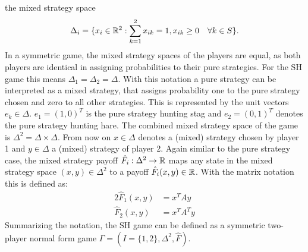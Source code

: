 the mixed strategy space 
\begin{align*}
        \Delta_i = \{ x_i \in \mathbb{R}^2 : \sum_{k=1}^2 x_{ik} = 1, x_{ik} \geq 0 \quad
\forall k \in S\}.
\end{align*}
In a symmetric game, the mixed strategy spaces of the players are
equal, as both players are identical in assigning probabilities to their
pure strategies. For the SH game this means $\Delta_1 = \Delta_2 = \Delta$.
With this notation a pure strategy can be interpreted as a mixed strategy,
that assigns probability one to the pure strategy chosen and zero to all
other strategies. This is represented by the unit vectors 
$e_k \in \Delta$. $e_1 = (1,0)^T$ is the pure strategy hunting stag 
and $e_2 =(0,1)^T$ denotes the pure strategy hunting hare.
The combined mixed strategy space of the game is $\Delta^2 = \Delta \times
\Delta$.
From now on $x \in \Delta$ denotes a (mixed) strategy
chosen by player 1 and $y \in \Delta$ a (mixed) strategy of player 2.
Again similar to the pure strategy case, the mixed strategy payoff 
$\hat{F}_i:\Delta^2 \rightarrow \mathbb{R}$ maps 
any state in the mixed strategy
space  $(x,y) \in \Delta^2$ to a payoff $\hat{F}_i(x,y) \in \mathbb{R}$.
With the matrix notation this is defined as: 
\begin{alignat*}{2}
        \hat{F}_1(x,y) &= x^T A y \\
        \hat{F}_2(x,y) &= x^T A^T y 
\end{alignat*}
Summarizing the notation, the SH game can be defined as a symmetric two-player
normal form game $\Gamma = (I=\{1,2\}, \Delta^2, \hat{F})$.

